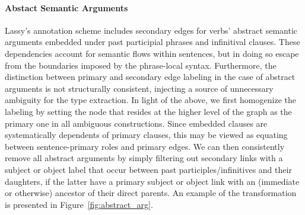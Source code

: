 \paragraph{Abstact Semantic Arguments}
Lassy's annotation scheme includes secondary edges for verbs' abstract semantic arguments embedded under past participial phrases and infinitival clauses.
These dependencies account for semantic flows within sentences, but in doing so escape from the boundaries imposed by the phrase-local syntax.
Furthermore, the distinction between primary and secondary edge labeling in the case of abstract arguments is not structurally consistent, injecting a source of unnecessary ambiguity for the type extraction.
In light of the above, we first homogenize the labeling by setting the node that resides at the higher level of the graph as the primary one in all ambiguous constructions.
Since embedded clauses are systematically dependents of primary clauses, this may be viewed as equating between sentence-primary roles and primary edges.
We can then consistently remove all abstract arguments by simply filtering out secondary links with a subject or object label that occur between past participles/infinitives and their daughters, if the latter have a primary subject or object link with an (immediate or otherwise) ancestor of their direct parents.
An example of the transformation is presented in Figure~\ref{fig:abstract_arg}.

